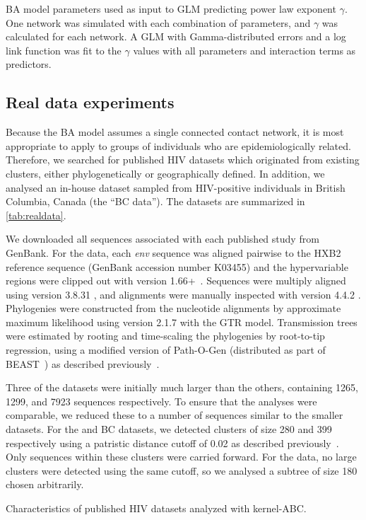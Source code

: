 \begin{table}
  \centering
  
  \caption[\gls{BA} parameters used as input \gls{GLM} predicting $\gamma$]
  {
    \gls{BA} model parameters used as input to \gls{GLM} predicting power law
    exponent $\gamma$. One network was simulated with each combination of
    parameters, and $\gamma$ was calculated for each network. A \gls{GLM} with
    Gamma-distributed errors and a log link function was fit to the $\gamma$
    values with all parameters and interaction terms as predictors.
  }
  \label{tab:gammaexpt}
\end{table}

\subsection{Real data experiments}

Because the \gls{BA} model assumes a single connected contact network, it is
most appropriate to apply to groups of individuals who are epidemiologically
related. Therefore, we searched for published \gls{HIV} datasets which
originated from existing clusters, either phylogenetically or geographically
defined. In addition, we analysed an in-house dataset sampled from
\gls{HIV}-positive individuals in British Columbia, Canada (the ``BC data'').
The datasets are summarized in \cref{tab:realdata}.

We downloaded all sequences associated with each published study from GenBank.
For the \textcite{novitsky2014impact} data, each \textit{env} sequence was
aligned pairwise to the HXB2 reference sequence (GenBank accession number
K03455) and the hypervariable regions were clipped out with
 version 1.66+~\autocite{cock2009biopython}. Sequences were
multiply aligned using  version 3.8.31
\autocite{edgar2004muscle}, and alignments were manually inspected with
 version 4.4.2 \autocite{gouy2010seaview}. Phylogenies were
constructed from the nucleotide alignments by approximate maximum likelihood
using  version 2.1.7 with the \gls{GTR} model. Transmission
trees were estimated by rooting and time-scaling the phylogenies by root-to-tip
regression, using a modified version of Path-O-Gen (distributed as part of
BEAST~\autocite{drummond2007beast}) as described
previously~\autocite{poon2015phylodynamic}. 

Three of the datasets \autocite[][and the BC data]{li2015hiv,novitsky2014impact}
were initially much larger than the others, containing 1265, 1299, and 7923
sequences respectively. To ensure that the analyses were comparable, we reduced
these to a number of sequences similar to the smaller datasets. For the
\citeauthor{li2015hiv} and BC datasets, we detected clusters of size 280 and
399 respectively using a patristic distance cutoff of 0.02 as described
previously~\autocite{poon2015impact}. Only sequences within these clusters were
carried forward. For the \textcite{novitsky2014impact} data, no large clusters
were detected using the same cutoff, so we analysed a subtree of size 180
chosen arbitrarily.

\begin{table}[ht]
  \centering
  
  \caption{Characteristics of published HIV datasets analyzed with kernel-ABC.}
  \label{tab:realdata}
\end{table}

